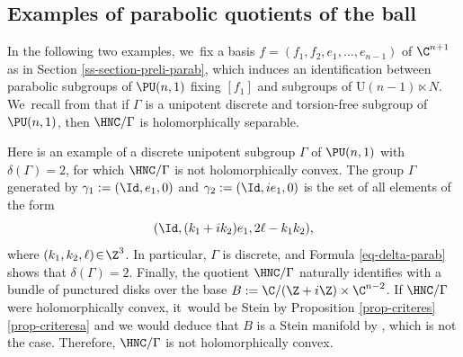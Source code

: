 \subsection{Examples of parabolic quotients of the ball}
In the following two examples, we~fix a basis $f=(f_1,f_2,e_1,\dots,e_{n-1})$ of $\C^{n+1}$ as in Section \ref{ss-section-preli-parab}, which induces an identification between parabolic subgroups of $\PU(n,1)$ fixing $[f_1]$ and subgroups of $\mathrm{U}(n-1)\ltimes N$. We~recall from \cite[Prop.\,1.1]{miebachQuotientsBoundedHomogeneous2024} that if $\Gamma$ is a unipotent discrete and torsion-free subgroup of $\PU(n,1)$, then $\HNC/\Gamma$ is holomorphically separable.

\begin{example}Here is an example of a discrete unipotent subgroup $\Gamma$ of $\PU(n,1)$ with $\delta(\Gamma)=2$, for which $\HNC/\Gamma$ is not holomorphically convex. The group $\Gamma$ generated by $\gamma_1:=(\Id,e_1,0)$ and $\gamma_2:=(\Id, ie_1,0)$ is the set of all elements of the form
\begin{equation*}
(\Id,(k_1+ik_2)e_1,2\ell-k_1k_2),
\end{equation*}
where $(k_1,k_2,\ell)\!\in\! \Z^3$. In particular, $\Gamma$ is discrete, and Formula \eqref{eq-delta-parab} shows that \hbox{$\delta(\Gamma)\!=\!2$}. Finally, the quotient $\HNC/\Gamma$ naturally identifies with a bundle of punctured disks over the base $B:=\C/(\Z+i\Z) \times \C^{n-2}$. If $\HNC/\Gamma$ were holomorphically convex, it~would be Stein by Proposition \ref{prop-criteres}\eqref{prop-criteresa} and we would deduce that $B$ is a Stein manifold by \cite[Lem.\,1.6]{coltoiuOpenSetsStein1997}, which is not the case. Therefore, $\HNC/\Gamma$ is not holomorphically convex.
\end{example}

